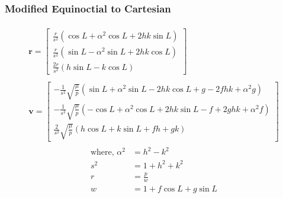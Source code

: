 \subsubsection{Modified Equinoctial to Cartesian\label{mee2rec}}


\begin{subequations}
    \begin{align}
        \begin{split}
            \mathbf{r}=\left[\begin{array}{c}
                    \frac{r}{s^2}\left(\cos L+\alpha^2 \cos L+2 h k \sin L\right) \\
                    \frac{r}{s^2}\left(\sin L-\alpha^2 \sin L+2 h k \cos L\right) \\
                    \frac{2 r}{s^2}(h \sin L-k \cos L)
                \end{array}\right]
        \end{split} \\
        \begin{split}
            \mathbf{v}=\left[\begin{array}{c}
                    -\frac{1}{s^2} \sqrt{\frac{\mu}{p}}\left(\sin L+\alpha^2 \sin L-2 h k \cos L+g-2 f h k+\alpha^2 g\right)  \\
                    -\frac{1}{s^2} \sqrt{\frac{\mu}{p}}\left(-\cos L+\alpha^2 \cos L+2 h k \sin L-f+2 g h k+\alpha^2 f\right) \\
                    \frac{2}{s^2} \sqrt{\frac{\mu}{p}}(h \cos L+k \sin L+f h+g k)\end{array}\right]
        \end{split}
    \end{align}
\end{subequations}
\begin{equation*}
    \begin{aligned}
        \text{where, }
        \alpha^2 & =h^2-k^2             \\
        s^2      & =1+h^2+k^2           \\
        r        & =\frac{p}{w}         \\
        w        & =1+f \cos L+g \sin L
    \end{aligned}
\end{equation*}

